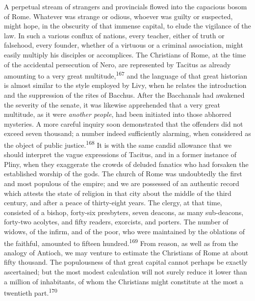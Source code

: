 

A perpetual stream of strangers and provincials flowed into the
capacious bosom of Rome. Whatever was strange or odious, whoever
was guilty or suspected, might hope, in the obscurity of that
immense capital, to elude the vigilance of the law. In such a
various conflux of nations, every teacher, either of truth or
falsehood, every founder, whether of a virtuous or a criminal
association, might easily multiply his disciples or accomplices.
The Christians of Rome, at the time of the accidental persecution
of Nero, are represented by Tacitus as already amounting to a
very great multitude,\textsuperscript{167} and the language of that great
historian is almost similar to the style employed by Livy, when
he relates the introduction and the suppression of the rites of
Bacchus. After the Bacchanals had awakened the severity of the
senate, it was likewise apprehended that a very great multitude,
as it were \textit{another people}, had been initiated into those
abhorred mysteries. A more careful inquiry soon demonstrated that
the offenders did not exceed seven thousand; a number indeed
sufficiently alarming, when considered as the object of public
justice.\textsuperscript{168} It is with the same candid allowance that we should
interpret the vague expressions of Tacitus, and in a former
instance of Pliny, when they exaggerate the crowds of deluded
fanatics who had forsaken the established worship of the gods.
The church of Rome was undoubtedly the first and most populous of
the empire; and we are possessed of an authentic record which
attests the state of religion in that city about the middle of
the third century, and after a peace of thirty-eight years. The
clergy, at that time, consisted of a bishop, forty-six
presbyters, seven deacons, as many sub-deacons, forty-two
acolytes, and fifty readers, exorcists, and porters. The number
of widows, of the infirm, and of the poor, who were maintained by
the oblations of the faithful, amounted to fifteen hundred.\textsuperscript{169}
From reason, as well as from the analogy of Antioch, we may
venture to estimate the Christians of Rome at about fifty
thousand. The populousness of that great capital cannot perhaps
be exactly ascertained; but the most modest calculation will not
surely reduce it lower than a million of inhabitants, of whom the
Christians might constitute at the most a twentieth part.\textsuperscript{170}

